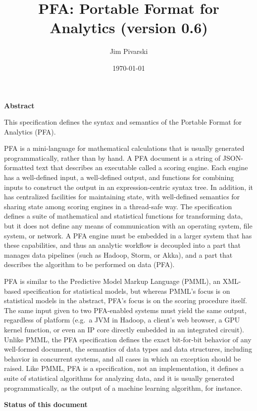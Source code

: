 \documentclass{article}
\title{PFA: Portable Format for Analytics (version 0.6)}
\author{Jim Pivarski}
\date{\today}
\theoremstyle{definition}
\begin{document}
\maketitle

{\large \bf Abstract}
\vspace{0.25 cm}

This specification defines the syntax and semantics of the Portable Format for Analytics (PFA).

PFA is a mini-language for mathematical calculations that is usually generated programmatically, rather than by hand.  A PFA document is a string of JSON-formatted text that describes an executable called a scoring engine.  Each engine has a well-defined input, a well-defined output, and functions for combining inputs to construct the output in an expression-centric syntax tree.  In addition, it has centralized facilities for maintaining state, with well-defined semantics for sharing state among scoring engines in a thread-safe way.  The specification defines a suite of mathematical and statistical functions for transforming data, but it does not define any means of communication with an operating system, file system, or network.  A PFA engine must be embedded in a larger system that has these capabilities, and thus an analytic workflow is decoupled into a part that manages data pipelines (such as Hadoop, Storm, or Akka), and a part that describes the algorithm to be performed on data (PFA).  

PFA is similar to the Predictive Model Markup Language (PMML), an XML-based specification for statistical models, but whereas PMML's focus is on statistical models in the abstract, PFA's focus is on the scoring procedure itself.  The same input given to two PFA-enabled systems must yield the same output, regardless of platform (e.g.\ a JVM in Hadoop, a client's web browser, a GPU kernel function, or even an IP core directly embedded in an integrated circuit).  Unlike PMML, the PFA specification defines the exact bit-for-bit behavior of any well-formed document, the semantics of data types and data structures, including behavior in concurrent systems, and all cases in which an exception should be raised.  Like PMML, PFA is a specification, not an implementation, it defines a suite of statistical algorithms for analyzing data, and it is usually generated programmatically, as the output of a machine learning algorithm, for instance.

\vspace{0.5 cm}
{\large \bf Status of this document}
\vspace{0.25 cm}
\end{document}
